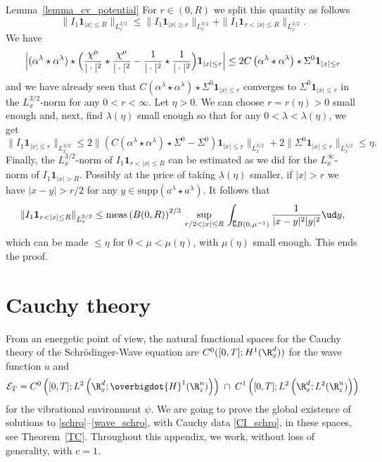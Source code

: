 \begin{ProofOf}{Lemma~\ref{lemma_cv_potential}}
For $r\in(0,R)$ we split this quantity as follows
\[
\|I_{1}\mathbf{1}_{|x|\leq R}\|_{L_{x}^{3/2}}\leq\|I_{1}\mathbf{1}_{|x|\geq r}\|_{L_{x}^{3/2}}+\|I_{1}\mathbf{1}_{r<|x|\leq R}\|_{L_{x}^{3/2}}.
\]
We have
\[
\Bigl |(\alpha^{\lambda}\star\alpha^{\lambda})\star \Bigl(\frac{\chi^{\mu}}{|\cdot|^{2}}\star\frac{\chi^{\mu}}{|\cdot|^{2}}-\frac{1}{|\cdot|^{2}}\star\frac{1}{|\cdot|^{2}} \Bigr)\mathbf{1}_{|x|\leq r} \Bigr|\leq 2C\left(\alpha^{\lambda}\star\alpha^{\lambda}\right)\star\Sigma^{0}\mathbf{1}_{|x|\leq r}
\]
and we have already seen that $C(\alpha^{\lambda}\star\alpha^{\lambda})\star\Sigma^{0}\mathbf{1}_{|x|\leq r}$ converges to $\Sigma^{0}\mathbf{1}_{|x|\leq r}$ in the $L_{x}^{3/2}$-norm for any $0<r<\infty$.
Let $\eta>0$. We can choose $r=r(\eta)>0$ small enough and, next, find $\lambda(\eta)$ small enough so that for any $0<\lambda<\lambda(\eta)$, we get
\[
\|I_{1}\mathbf{1}_{|x|\leq r}\|_{L_{x}^{3/2}}\leq 2\|(C(\alpha^{\lambda}\star\alpha^{\lambda})\star\Sigma^{0}-\Sigma^{0})\mathbf{1}_{|x|\leq r}\|_{L_{x}^{3/2}}+2\|\Sigma^{0}\mathbf{1}_{|x|\leq r}\|_{L_{x}^{3/2}}
\leq \eta.
\]
Finally, the $L_{x}^{3/2}$-norm of $I_{1}\mathbf{1}_{r<|x|\leq R}$ can be estimated as we did for the $L_{x}^{\infty}$-norm of $I_{1}\mathbf{1}_{|x|>R}$.
Possibly at the price of taking $\lambda(\eta)$ smaller,
if $|x|>r$ we have $|x-y|>r/2$ for any $y\in \mathrm{supp}(a^\lambda\star a^\lambda)$. It follows that
\[
\|I_{1}\mathbf{1}_{r<|x|\leq R}\|_{L_{x}^{3/2}}\leq\mathrm{meas}\left(B(0,R)\right)^{2/3}\,\underset{r/2<|x|\leq R}{\sup}\,\int_{\complement B(0,\mu^{-1})}\frac{1}{|x-y|^{2}|y|^{2}}\ud y,
\]
which can be made $\leq \eta$ for $0<\mu<\mu(\eta)$, with $\mu(\eta)$ small enough.
This ends the proof.
\end{ProofOf}

\appendix
\section{Cauchy theory}\label{CauchyTheory}

From an energetic point of view, the natural functional spaces for the Cauchy theory of the Schrödinger-Wave equation are $C^{0}([0,T];H^{1}(\R_{x}^{d}))$ for the wave function $u$ and
\[
\mathcal{E}_{T}=C^{0}\left([0,T];L^{2}\left(\R_{x}^{d};\overbigdot{H}^{1}(\R_{z}^{n})\right)\right)\;\cap\;C^{1}\left([0,T];L^{2}\left(\R_{x}^{d};L^{2}(\R_{z}^{n})\right)\right)
\]
for the vibrational environment $\psi$.
We are going to prove the global existence of solutions to \eqref{schro}--\eqref{wave_schro}, with Cauchy data \eqref{CI_schro},
in these spaces, see Theorem~\ref{TC}.
Throughout this appendix, we work, without loss of generality, with $c=1$.

